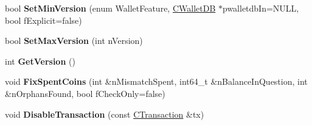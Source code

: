 \begin{DoxyCompactItemize}
bool {\bfseries Set\+Min\+Version} (enum Wallet\+Feature, \mbox{\hyperlink{class_c_wallet_d_b}{C\+Wallet\+DB}} $\ast$pwalletdb\+In=N\+U\+LL, bool f\+Explicit=false)
\item 
\mbox{\label{class_c_wallet_a1bb7c19e7dd483f231f8077fb7fb942b}} 
bool {\bfseries Set\+Max\+Version} (int n\+Version)
\item 
\mbox{\label{class_c_wallet_a3e37adcf1b2ad9fc02ae3e8da7c692c9}} 
int {\bfseries Get\+Version} ()
\item 
\mbox{\label{class_c_wallet_a353254950063b83b6c96a0bfa96a7f4d}} 
void {\bfseries Fix\+Spent\+Coins} (int \&n\+Mismatch\+Spent, int64\+\_\+t \&n\+Balance\+In\+Question, int \&n\+Orphans\+Found, bool f\+Check\+Only=false)
\item 
\mbox{\label{class_c_wallet_a1782cbf0771e3c5dc440cbfd421a97b2}} 
void {\bfseries Disable\+Transaction} (const \mbox{\hyperlink{class_c_transaction}{C\+Transaction}} \&tx)
\end{DoxyCompactItemize}
